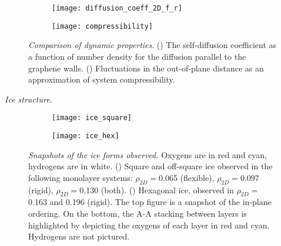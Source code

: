 \documentclass[12pt]{article}
\begin{document}
\begin{figure}[ht!]
	\centering
	\begin{subfigure}[b]{0.28\textwidth}
    		\texttt{[image: diffusion\_coeff\_2D\_f\_r]}
		\caption{}
    		\label{fig:diff}
   	\end{subfigure}	
	\begin{subfigure}[b]{0.28\textwidth}
    		\texttt{[image: compressibility]}
		\caption{}
    		\label{fig:comp}
   	\end{subfigure}
	\caption{\textit{Comparison of dynamic properties}. (\protect{}) The self-diffusion coefficient as a function of number density for the diffusion parallel to the graphene walls. (\protect{}) Fluctuations in the out-of-plane distance as an approximation of system compressibility.}
	\label{fig:msd}
\end{figure}

\textit{Ice structure}.

\begin{figure}[ht!]
	\centering
	\begin{subfigure}[b]{0.395\textwidth}
    		\texttt{[image: ice\_square]}
		\caption{}
        		\label{fig:ice_sq}
  	\end{subfigure}
	\begin{subfigure}[b]{0.285\textwidth}
    		\texttt{[image: ice\_hex]}
		\caption{}
        		\label{fig:ice_hx}
  	\end{subfigure}
	\caption{\textit{Snapshots of the ice forms observed.} Oxygens are in red and cyan, hydrogens are in white. (\protect{}) Square and off-square ice observed in the following monolayer systems: \(\rho_{2D}=\)0.065 (flexible), \(\rho_{2D}=\)0.097 (rigid), \(\rho_{2D}=\)0.130 (both). (\protect{}) Hexagonal ice, observed in \(\rho_{2D}=\)0.163 and 0.196 (rigid). The top figure is a snapshot of the in-plane ordering. On the bottom, the A-A stacking between layers is highlighted by depicting the oxygens of each layer in red and cyan. Hydrogens are not pictured.}
	\label{fig:ice_figs}
\end{figure}

\clearpage
\printbibliography
\end{document}
